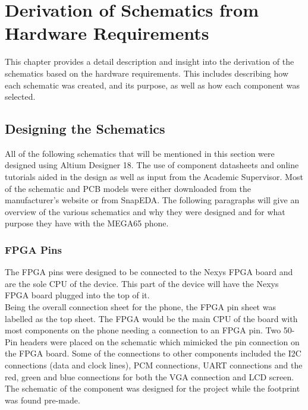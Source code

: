 
\chapter{Derivation of Schematics from Hardware Requirements} %

\label{Chapter5} %

This chapter provides a detail description and insight into the derivation of the schematics based on the hardware requirements. This includes describing how each schematic was created, and its purpose, as well as how each component was selected.


\section{Designing the Schematics}

	All of the following schematics that will be mentioned in this section were designed using Altium Designer 18. The use of component datasheets and online tutorials aided in the design as well as input from the Academic Supervisor. Most of the schematic and PCB models were either downloaded from the manufacturer's website or from SnapEDA. The following paragraphs will give an overview of the various schematics and why they were designed and for what purpose they have with the MEGA65 phone.

\subsection{FPGA Pins}
\label{chap:FPGA}
	The FPGA pins were designed to be connected to the Nexys FPGA board and are the sole CPU of the device. This part of the device will have the Nexys FPGA board plugged into the top of it.\\
Being the overall connection sheet for the phone, the FPGA pin sheet was labelled as the top sheet. The FPGA would be the main CPU of the board with most components on the phone needing a connection to an FPGA pin. Two 50-Pin headers were placed on the schematic which mimicked the pin connection on the FPGA board. Some of the connections to other components included the I2C connections (data and clock lines), PCM connections, UART connections and the red, green and blue connections for both the VGA connection and LCD screen.\\
The schematic of the component was designed for the project while the footprint was found pre-made. 

